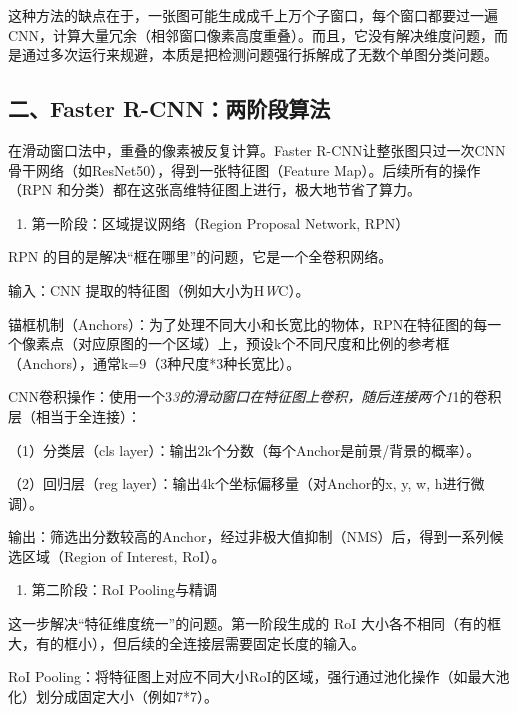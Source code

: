 这种方法的缺点在于，一张图可能生成成千上万个子窗口，每个窗口都要过一遍CNN，计算大量冗余（相邻窗口像素高度重叠）。而且，它没有解决维度问题，而是通过多次运行来规避，本质是把检测问题强行拆解成了无数个单图分类问题。

\hypertarget{ux4e8cfaster-r-cnnux4e24ux9636ux6bb5ux7b97ux6cd5}{%
\subsection{二、Faster R-CNN：两阶段算法}\label{ux4e8cfaster-r-cnnux4e24ux9636ux6bb5ux7b97ux6cd5}}

在滑动窗口法中，重叠的像素被反复计算。Faster R-CNN让整张图只过一次CNN骨干网络（如ResNet50），得到一张特征图（Feature Map）。后续所有的操作（RPN 和分类）都在这张高维特征图上进行，极大地节省了算力。

\begin{enumerate}
\def\labelenumi{\arabic{enumi}.}
\tightlist
\item
  第一阶段：区域提议网络（Region Proposal Network, RPN）
\end{enumerate}

RPN 的目的是解决``框在哪里''的问题，它是一个全卷积网络。

输入：CNN 提取的特征图（例如大小为H\emph{W}C）。

锚框机制（Anchors）：为了处理不同大小和长宽比的物体，RPN在特征图的每一个像素点（对应原图的一个区域）上，预设k个不同尺度和比例的参考框（Anchors），通常k=9（3种尺度*3种长宽比）。

CNN卷积操作：使用一个3\emph{3的滑动窗口在特征图上卷积，随后连接两个1}1的卷积层（相当于全连接）：

（1）分类层（cls layer）：输出2k个分数（每个Anchor是前景/背景的概率）。

（2）回归层（reg layer）：输出4k个坐标偏移量（对Anchor的x, y, w, h进行微调）。

输出：筛选出分数较高的Anchor，经过非极大值抑制（NMS）后，得到一系列候选区域（Region of Interest, RoI）。

\begin{enumerate}
\def\labelenumi{\arabic{enumi}.}
\setcounter{enumi}{1}
\tightlist
\item
  第二阶段：RoI Pooling与精调
\end{enumerate}

这一步解决``特征维度统一''的问题。第一阶段生成的 RoI 大小各不相同（有的框大，有的框小），但后续的全连接层需要固定长度的输入。

RoI Pooling：将特征图上对应不同大小RoI的区域，强行通过池化操作（如最大池化）划分成固定大小（例如7*7）。

